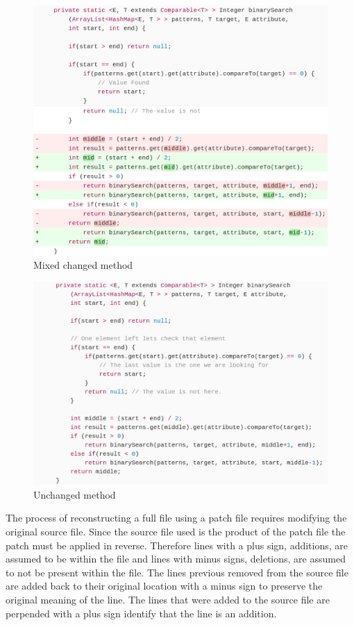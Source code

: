 \begin{figure}[!ht]
    \centering
        \includegraphics[width=1.0\textwidth]{images/simple_complex}
    \caption{Mixed changed method}
    \label{fig:changed_method}
\end{figure}

\begin{figure}[!ht]
    \centering
        \includegraphics[width=1.0\textwidth]{images/unchanged_example}
    \caption{Unchanged method}
    \label{fig:unchanged_method}
\end{figure}

The process of reconstructing a full file using a patch file requires modifying the original source file. Since the source file used is the product of the patch file the patch must be applied in reverse. Therefore lines with a plus sign, additions, are assumed to be within the file and lines with minus signs, deletions, are assumed to not be present within the file. The lines previous removed from the source file are added back to their original location with a minus sign to preserve the original meaning of the line. The lines that were added to the source file are perpended with a plus sign identify that the line is an addition.

